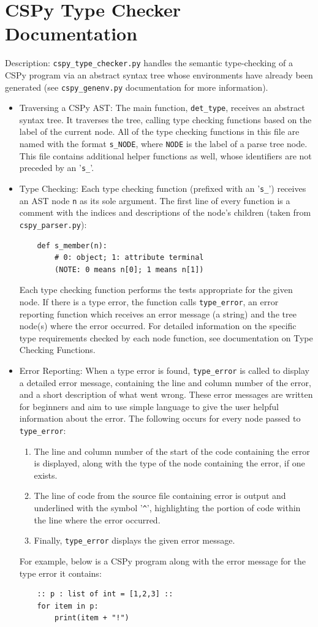\documentclass{article}
\begin{document}
\section{CSPy Type Checker Documentation}
Description: \verb|cspy_type_checker.py| handles the semantic type-checking of a CSPy program via an abstract syntax tree whose environments have already been generated (see \verb|cspy_genenv.py| documentation for more information).
\begin{itemize}
\item Traversing a CSPy AST: The main function, \verb|det_type|, receives an abstract syntax tree. It traverses the tree, calling type checking functions based on the label of the current node. All of the type checking functions in this file are named with the format \verb|s_NODE|, where \verb|NODE| is the label of a parse tree node. This file contains additional helper functions as well, whose identifiers are not preceded by an '\verb|s_|'.
\item Type Checking: Each type checking function (prefixed with an '\verb|s_|') receives an AST node \verb|n| as its sole argument. The first line of every function is a comment with the indices and descriptions of the node's children (taken from \verb|cspy_parser.py|):
\begin{verbatim}
    def s_member(n):
        # 0: object; 1: attribute terminal
        (NOTE: 0 means n[0]; 1 means n[1])
\end{verbatim}
Each type checking function performs the tests appropriate for the given node. If there is a type error, the function calls \verb|type_error|, an error reporting function which receives an error message (a string) and the tree node(s) where the error occurred. For detailed information on the specific type requirements checked by each node function, see documentation on Type Checking Functions.
\item Error Reporting: When a type error is found, \verb|type_error| is called to display a detailed error message, containing the line and column number of the error, and a short description of what went wrong. These error messages are written for beginners and aim to use simple language to give the user helpful information about the error. The following occurs for every node passed to \verb|type_error|:
\begin{enumerate}
\item The line and column number of the start of the code containing the error is displayed, along with the type of the node containing the error, if one exists.
\item The line of code from the source file containing error is output and underlined  with the symbol '\verb|^|', highlighting the portion of code within the line where the error occurred.
\item Finally, \verb|type_error| displays the given error message.
\end{enumerate}
For example, below is a CSPy program along with the error message for the type error it contains:
\begin{verbatim}
    :: p : list of int = [1,2,3] ::
    for item in p:
        print(item + "!")


\end{verbatim}
\end{itemize}
\end{document}
